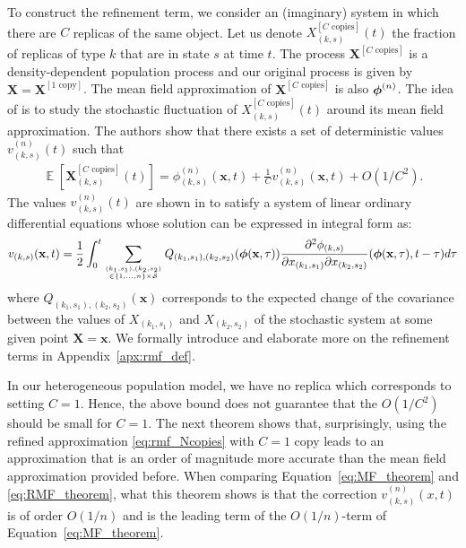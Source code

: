 \documentclass[acmsmall]{acmart}
\newcommand\bx{\mathbf{x}}
\newcommand\bX{\mathbf{X}}
\newcommand\bphi{\text{\boldmath$\phi$}}
\newcommand\calS{\mathcal{S}}
\newcommand\toN{^{(n)}}
\newcommand{\ncopies}{^{[C\text{ copies}]}}
\newcommand{\onecopy}{^{[1\text{ copy}]}}
\DeclareMathOperator{\E}{\mathbb{E}} %
\newcommand\esp[1]{\E\left[#1\right]} %
\newcommand{\dd}[3]{ \frac{\partial^2 #1 }{ \partial x_{#2} \partial x_{#3}}}
\begin{document}
To construct the refinement term, we consider an (imaginary) system in which there are $C$ replicas of the same object. Let us denote $X\ncopies_{(k,s)}(t)$ the fraction of replicas of type $k$ that are in state $s$ at time $t$. The process $\mathbf{X}\ncopies$ is a density-dependent population process and our original process is given by $\bX=\bX\onecopy$. The mean field approximation of $\bX\ncopies$ is also $\bphi\toN$.  The idea of \cite{gastSizeExpansionsMean2019} is to study the stochastic fluctuation of $X\ncopies_{(k,s)}(t)$ around its mean field approximation. The authors show that there exists a set of deterministic values $v\toN_{(k,s)}(t)$ such that
\begin{align}
  \label{eq:rmf_Ncopies}
  \esp{\mathbf{X}\ncopies_{(k,s)}(t)} = \phi\toN_{(k,s)}(\bx,t) + \frac1C v\toN_{(k,s)}(\bx,t) + O(1/C^2).
\end{align}
The values $v\toN_{(k,s)}(t)$ are shown in \cite{gastSizeExpansionsMean2019} to satisfy a system of linear ordinary differential equations whose solution can be expressed in integral form as:
\begin{align*}
v_{(k,s)}(\bx, t) = \frac{1}{2}\int_0^t\sum_{(k_1,s_1),(k_2,s_2)\atop \in \{1,\hdots,n\}\times \calS} Q_{(k_1,s_1),(k_2,s_2)}(\bphi(\bx,\tau))\dd{\phi_{(k,s)}}{(k_1,s_1)}{(k_2,s_2)}(\bphi(\bx,\tau),t-\tau)d\tau
\end{align*}
where $Q_{(k_1,s_1),(k_2,s_2)}(\bx)$ corresponds to the expected change of the covariance between the values of $X_{(k_1,s_1)}$ and $X_{(k_2,s_2)}$ of the stochastic system at some given point $\bX = \bx$. We formally introduce and elaborate more on the refinement terms in Appendix~\ref{apx:rmf_def}.

In our heterogeneous population model, we have no replica which corresponds to setting $C=1$. Hence, the above bound does not guarantee that the $O(1/C^2)$ should be small for $C=1$. The next theorem shows that, surprisingly, using the refined approximation \eqref{eq:rmf_Ncopies} with $C=1$ copy leads to an approximation that is an order of magnitude more accurate than the mean field approximation provided before. When comparing Equation~\eqref{eq:MF_theorem} and \eqref{eq:RMF_theorem}, what this theorem shows is that the correction $v\toN_{(k,s)}(x,t)$ is of order $O(1/n)$ and is the leading term of the $O(1/n)$-term of Equation~\eqref{eq:MF_theorem}. 
\end{document}
